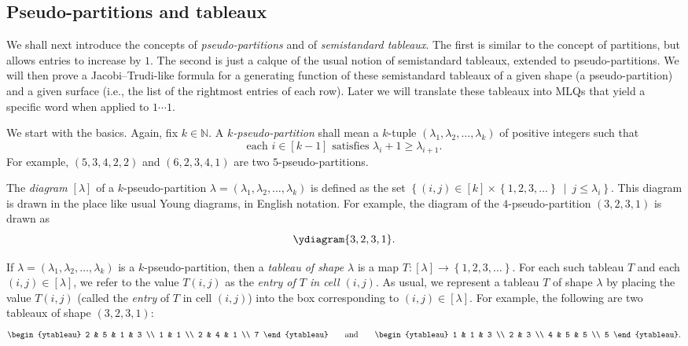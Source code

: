 \documentclass[reqno]{amsart}%
\newcommand{\0}{\phantom{c}}
\newcommand{\ive}[1]{\left[ #1 \right]}
\newcommand{\defn}[1]{{\color{darkred}\emph{#1}}}
\theoremstyle{plain}
\theoremstyle{definition}
\numberwithin{equation}{section}
\begin{document}
\subsection{Pseudo-partitions and tableaux}

We shall next introduce the concepts of \textit{pseudo-partitions} and of
\textit{semistandard tableaux}. The first is similar to the concept of
partitions, but allows entries to increase by $1$. The second is just a calque
of the usual notion of semistandard tableaux, extended to pseudo-partitions.
We will then prove a Jacobi--Trudi-like formula for a generating function of
these semistandard tableaux of a given shape (a pseudo-partition) and a given
surface (i.e., the list of the rightmost entries of each row). Later we will
translate these tableaux into MLQs that yield a specific word when applied to
$1\cdots1$.

We start with the basics. Again, fix $k\in\mathbb{N}$. A
\defn{$k$-pseudo-partition} shall mean a $k$-tuple $\left(  \lambda
_{1},\lambda_{2},\ldots,\lambda_{k}\right)  $ of positive integers such that%
\[
\text{each }i\in\left[  k-1\right]  \text{ satisfies }\lambda_{i}+1\geq
\lambda_{i+1}.
\]
For example, $\left(  5,3,4,2,2\right)  $ and $\left(  6,2,3,4,1\right)  $ are
two $5$-pseudo-partitions.

The \defn{diagram $\ive{\lambda}$} of a $k$-pseudo-partition $\lambda=\left(
\lambda_{1},\lambda_{2},\ldots,\lambda_{k}\right)  $ is defined as the set
$\left\{  \left(  i,j\right)  \in\left[  k\right]  \times\left\{
1,2,3,\ldots\right\}  \ \mid\ j\leq\lambda_{i}\right\}  $. This diagram is
drawn in the place like usual Young diagrams, in English notation. For
example, the diagram of the $4$-pseudo-partition $\left(  3,2,3,1\right)  $ is
drawn as%
\[
\ydiagram{3,2,3,1}.
\]


If $\lambda=\left(  \lambda_{1},\lambda_{2},\ldots,\lambda_{k}\right)  $ is a
$k$-pseudo-partition, then a \defn{tableau of shape $\lambda$} is a map
$T:\left[  \lambda\right]  \rightarrow\left\{  1,2,3,\ldots\right\}  $. For
each such tableau $T$ and each $\left(  i,j\right)  \in\left[  \lambda\right]
$, we refer to the value $T\left(  i,j\right)  $ as the
\defn{entry of $T$ in cell $\left(i,j\right)$}. As usual, we represent a
tableau $T$ of shape $\lambda$ by placing the value $T\left(  i,j\right)  $
(called the \defn{entry} of $T$ in cell $\left(  i,j\right)  $) into the box
corresponding to $\left(  i,j\right)  \in\left[  \lambda\right]  $. For
example, the following are two tableaux of shape $\left(  3,2,3,1\right)  $:%
\begin{equation}
\begin{ytableau} 2 & 5 & 1 & 3 \\ 1 & 1 \\ 2 & 4 & 1 \\ 7 \end{ytableau}\qquad
\text{and}\qquad
\begin{ytableau} 1 & 1 & 3 \\ 2 & 3 \\ 4 & 5 & 5 \\ 5 \end{ytableau}.
\label{eq.tableau.exas}%
\end{equation}
\end{document}

